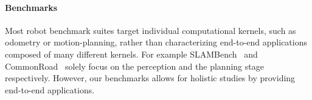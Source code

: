 \paragraph{Benchmarks} Most robot benchmark suites target individual computational kernels, such as odometry or motion-planning, rather than characterizing end-to-end applications composed of many different kernels. For example SLAMBench~\cite{slambench} and CommonRoad~\cite{common-road} solely focus on the perception and the planning stage respectively. However, our benchmarks allows for holistic studies by providing end-to-end applications. 

\renewcommand*{\arraystretch}{1.2}
\begin{table}[t!]
\vspace{10pt}
\caption{Impact of introducing depth image noise into the RGBD camera system on the drone's performance. Introducing noise into the drone's visual subsystem results in more frequent (re-)planning, which increases mission time and can also result in mission failures.}
\label{tbl:noise-data}
\end{table}
\renewcommand*{\arraystretch}{1}